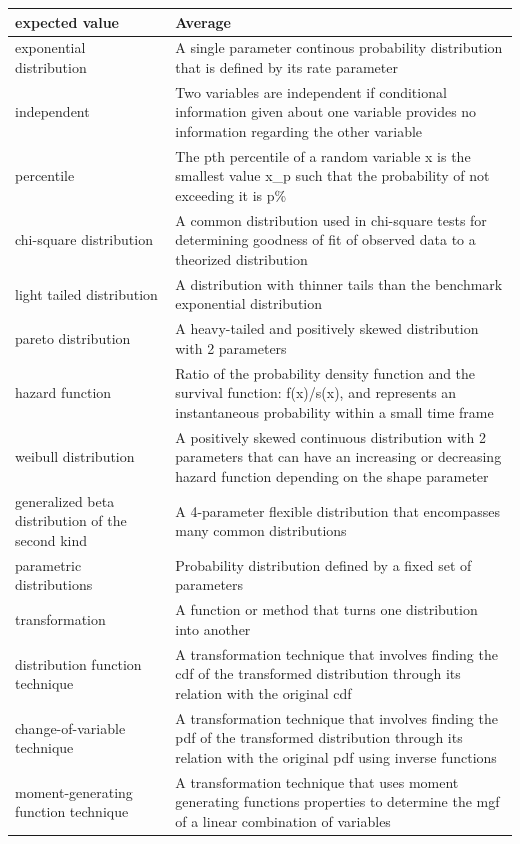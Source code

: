 \documentclass[
]{book}
\begin{document}
\begin{longtable}{>{\raggedright\arraybackslash}p{10em}|>{\raggedright\arraybackslash}p{30em}}
\hline
expected value & Average\\
\hline
exponential distribution & A single parameter continous probability distribution that is defined by its rate parameter\\
\hline
independent & Two variables are independent if conditional information given about one variable provides no information regarding the other variable\\
\hline
percentile & The pth percentile of a random variable x is the smallest value x\_p such that the probability of not exceeding it is p\%\\
\hline
chi-square distribution & A common distribution used in chi-square tests for determining goodness of fit of observed data to a theorized distribution\\
\hline
light tailed distribution & A distribution with thinner tails than the benchmark exponential distribution\\
\hline
pareto distribution & A heavy-tailed and positively skewed distribution with 2 parameters\\
\hline
hazard function & Ratio of the probability density function and the survival function: f(x)/s(x), and represents an instantaneous probability within a small time frame\\
\hline
weibull distribution & A positively skewed continuous distribution with 2 parameters that can have an increasing or decreasing hazard function depending on the shape parameter\\
\hline
generalized beta distribution of the second kind & A 4-parameter flexible distribution that encompasses many common distributions\\
\hline
parametric distributions & Probability distribution defined by a fixed set of parameters\\
\hline
transformation & A function or method that turns one distribution into another\\
\hline
distribution function technique & A transformation technique that involves finding the cdf of the transformed distribution through its relation with the original cdf\\
\hline
change-of-variable technique & A transformation technique that involves finding the pdf of the transformed distribution through its relation with the original pdf using inverse functions\\
\hline
moment-generating function technique & A transformation technique that uses moment generating functions properties to determine the mgf of a linear combination of variables\\

\end{longtable}
\end{document}
